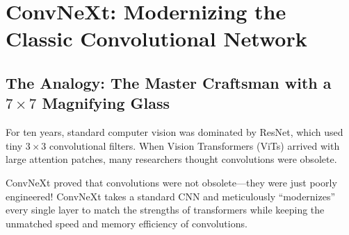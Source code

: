 \documentclass[11pt,a4paper]{article}
\begin{document}
\vspace{0.1in}

\section{ConvNeXt: Modernizing the Classic Convolutional Network}

\subsection{The Analogy: The Master Craftsman with a $7\times 7$ Magnifying Glass}
For ten years, standard computer vision was dominated by ResNet, which used tiny $3\times 3$ convolutional filters. When Vision Transformers (ViTs) arrived with large attention patches, many researchers thought convolutions were obsolete. 

ConvNeXt proved that convolutions were not obsolete---they were just poorly engineered! ConvNeXt takes a standard CNN and meticulously ``modernizes'' every single layer to match the strengths of transformers while keeping the unmatched speed and memory efficiency of convolutions.
\end{document}
